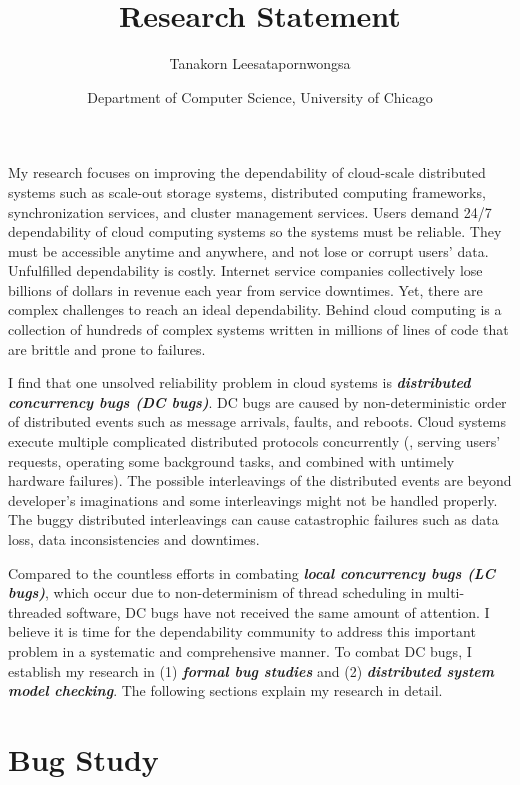 \documentclass[11pt]{article}
\begin{document}
\title{Research Statement}
\author{Tanakorn Leesatapornwongsa}
\date{\vspace{-1ex} \small{Department of Computer Science, University of
Chicago}}

\maketitle

My research focuses on improving the dependability of cloud-scale distributed
systems such as scale-out storage systems, distributed computing frameworks,
synchronization services, and cluster management services. Users demand 24/7
dependability of cloud computing systems so the systems must be reliable.  They
must be accessible anytime and anywhere, and not lose or corrupt users' data.
Unfulfilled dependability is costly. Internet service companies collectively
lose billions of dollars in revenue each year from service downtimes. Yet,
there are complex challenges to reach an ideal dependability.  Behind cloud
computing is a collection of hundreds of complex systems written in millions of
lines of code that are brittle and prone to failures.

I find that one unsolved reliability problem in cloud systems is
\textbf{\textit{distributed concurrency bugs (DC bugs)}}. DC bugs are caused by
non-deterministic order of distributed events such as message arrivals, faults,
and reboots. Cloud systems execute multiple complicated distributed protocols
concurrently (\eg, serving users' requests, operating some background tasks,
and combined with untimely hardware failures). The possible interleavings of
the distributed events are beyond developer's imaginations and some
interleavings might not be handled properly. The buggy distributed
interleavings can cause catastrophic failures such as data loss, data
inconsistencies and downtimes. 

Compared to the countless efforts in combating \textbf{\textit{local
concurrency bugs (LC bugs)}}, which occur due to non-determinism of thread
scheduling in multi-threaded software, DC bugs have not received the same
amount of attention.  I believe it is time for the dependability community to
address this important problem in a systematic and comprehensive manner. To
combat DC bugs, I establish my research in (1) \textbf{\textit{formal bug
studies}} and (2) \textbf{\textit{distributed system model checking}}. The
following sections explain my research in detail.

\section{Bug Study}
\end{document}
